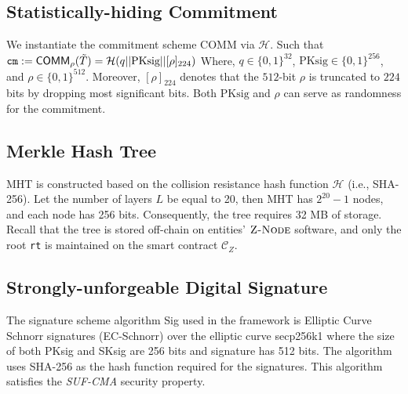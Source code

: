\subsection{Statistically-hiding Commitment}
We instantiate the commitment scheme \textsf{COMM} via $\mathcal{H}$. Such that 
$\texttt{cm}:=\mathsf{COMM}_\rho(\Tilde{T}) = \mathcal{H}(q||\text{PKsig}||[\rho]_{224})$
Where, $q \in \{0, 1\}^{32}$, $\text{PKsig} \in \{0, 1\}^{256}$, and $\rho \in \{0, 1\}^{512}$. Moreover, $[\rho]_{224}$ denotes that the $512$-bit $\rho$ is truncated to $224$ bits by dropping most significant bits. Both $\text{PKsig}$ and $\rho$ 
can serve as randomness for the commitment. 

\subsection{Merkle Hash Tree}
\textsf{MHT} is constructed based on the collision resistance hash function $\mathcal{H}$ (i.e., SHA-256). Let the number of layers $L$ be equal to 20, then \textsf{MHT} has $2^{20} -1$ nodes, and each node has 256 bits. Consequently, the tree requires 32 MB of storage. Recall that the tree is stored off-chain on entities' $\textsc{Z-Node}$ software, and only the root \texttt{rt} is maintained on the smart contract $\mathcal{C}_Z$.


\subsection{Strongly-unforgeable Digital Signature}

The signature scheme algorithm \textsf{Sig} used in the framework is Elliptic Curve Schnorr signatures (EC-Schnorr) \cite{Schnorr1991Signature} over the elliptic curve secp256k1 \cite{sec2_2010} where the size of both PKsig and SKsig are 256 bits and signature has 512 bits. The algorithm uses SHA-256 as the hash function required for the signatures. This algorithm satisfies the \textit{SUF-CMA} security property.


